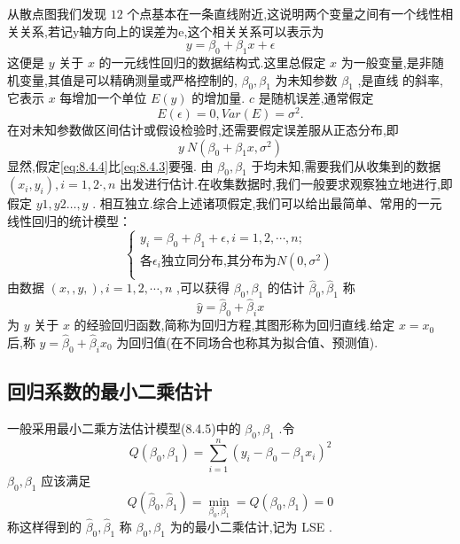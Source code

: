 \begin{example}
	从散点图我们发现 $ 12  $ 个点基本在一条直线附近,这说明两个变量之间有一个线性相关关系,若记y轴方向上的误差为e,这个相关关系可以表示为
	\begin{equation}
	y=\beta_0+\beta_1x+\epsilon
	\end{equation}
	这便是 $  y $ 关于 $  x $ 的一元线性回归的数据结构式.这里总假定 $  x $ 为一般变量,是非随机变量,其值是可以精确测量或严格控制的, $ \beta_0,\beta_1  $ 为未知参数 $ \beta_1  $ ,是直线
	的斜率,它表示 $  x $ 每增加一个单位 $ E(y)  $ 的增加量. $  c $ 是随机误差,通常假定
	\begin{equation}
	E(\epsilon)=0,Var(E)=\sigma^2. \label{eq:8.4.3}
	\end{equation}
	在对未知参数做区间估计或假设检验时,还需要假定误差服从正态分布,即
	\begin{equation}
	y~N(\beta_0+\beta_1x,\sigma^2)\label{eq:8.4.4}
	\end{equation}
	显然,假定\ref{eq:8.4.4}比\ref{eq:8.4.3}要强.
	由 $ \beta_0,\beta_1  $ 于均未知,需要我们从收集到的数据 $ (x_i,y_i),i=1,2\cdot,n  $ 出发进行估计.在收集数据时,我们一般要求观察独立地进行,即假定 $ y1,y2…,y  $ .
	相互独立.综合上述诸项假定,我们可以给出最简单、常用的一元线性回归的统计模型：
	\begin{equation}
	\left\{ \begin{array}{l}
	y_i=\beta _0+\beta _1+\epsilon ,i=1,2,\cdots ,n;\\
	\text{各}\epsilon _i\text{独立同分布,其分布为}N\left( 0,\sigma ^2 \right)\\
	\end{array} \right. 	
	\end{equation}
	由数据 $ (x,,y,),i=1,2,\cdots,n  $ ,可以获得 $ \beta_0,\beta_1  $ 的估计 $ \hat{\beta}_0,\hat{\beta}_1  $ 称
	\[
	\hat{y}=\hat{\beta}_0+\hat{\beta}_ix
	\]
	为 $  y $ 关于 $  x $ 的经验回归函数,简称为回归方程,其图形称为回归直线.给定 $ x=x_0  $ 后,称 $  \hat{y}=\hat{\beta}_0+\hat{\beta}_ix_0 $ 为回归值(在不同场合也称其为拟合值、预测值).
\end{example}

\subsection{回归系数的最小二乘估计}\label{sub:8.4.3}

一般采用最小二乘方法估计模型(8.4.5)中的 $ \beta_0,\beta_1  $ .令
\[
Q\left(\beta_{0}, \beta_{1}\right)=\sum_{i=1}^{n}\left(y_{i}-\beta_{0}-\beta_{1} x_{i}\right)^{2}
\]
$ \beta_0,\beta_1  $ 应该满足
\[
Q\left( \hat{\beta}_0,\hat{\beta} _1 \right) =\underset{\beta_0,\beta _1}{\min}=Q\left( \beta_0,\beta _1\right) =0	
\]
称这样得到的 $ \hat{\beta}_0,\hat{\beta} _1   $ 称 $ \beta_0,\beta _1  $ 为的最小二乘估计,记为 LSE .

